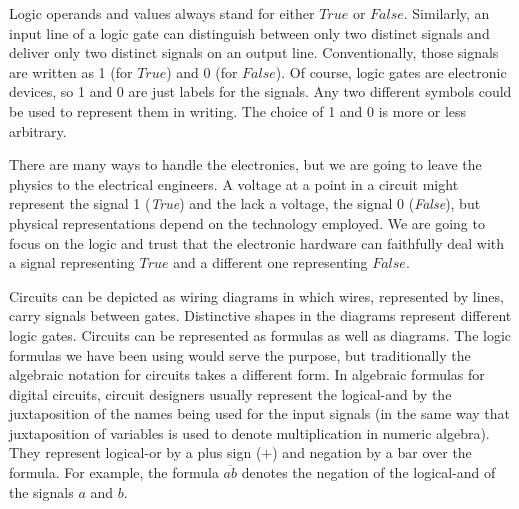 Logic operands and values always stand for either $True$ or $False$.
Similarly, an input line of a logic gate can distinguish between
only two distinct signals and deliver only two distinct
signals
on an output line.
Conventionally, those signals are written as 1 (for $True$) and 0 (for $False$).
Of course, logic gates are electronic devices,
so 1 and 0 are just labels for the signals.
Any two different symbols could be used to represent them in writing.
The choice of 1 and 0 is more or less arbitrary.

There are many ways to handle the electronics,
but we are going to leave the physics to the electrical engineers.
A voltage at a point in a circuit might represent
the signal 1 (\emph{True})
and the lack a voltage, the signal 0 (\emph{False}),
but physical representations depend on the technology employed.
We are going to focus on the logic and trust that
the electronic hardware can faithfully deal with
a signal representing $True$ and a different one representing $False$.

Circuits
can be depicted as wiring diagrams
in which wires, represented by lines, carry signals between gates.
Distinctive shapes in the diagrams represent different logic gates.
Circuits can be represented as formulas as well as diagrams.
The logic formulas we have been using would serve the purpose,
but traditionally the algebraic notation for circuits takes a
different form.
In algebraic formulas for digital circuits, circuit designers usually
represent the logical-and by the juxtaposition
of the names being used for the input signals (in the same way
that juxtaposition of variables is used to denote multiplication
in numeric algebra).
They represent logical-or by a plus sign ($+$)
and negation by a bar over the formula.
For example, the formula $\overline{ab}$ denotes the negation of the logical-and
of the signals $a$ and $b$.


